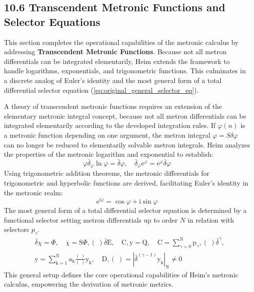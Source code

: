 \documentclass[12pt]{article}
\begin{document}
\subsection{10.6 Transcendent Metronic Functions and Selector Equations}
\label{sec:transcendent_functions}

This section completes the operational capabilities of the metronic calculus by addressing \textbf{Transcendent Metronic Functions}. Because not all metron differentials can be integrated elementarily, Heim extends the framework to handle logarithms, exponentials, and trigonometric functions. This culminates in a discrete analog of Euler's identity and the most general form of a total differential selector equation (\eqref{eq:original_general_selector_eq}).

A theory of transcendent metronic functions requires an extension of the elementary metronic integral concept, because not all metron differentials can be integrated elementarily according to the developed integration rules. If \( \varphi(n) \) is a metronic function depending on one argument, the metron integral \( \varphi = S \delta \varphi \) can no longer be reduced to elementarily solvable metron integrals. Heim analyzes the properties of the metronic logarithm and exponential to establish:
\begin{equation}
\varphi \bar{\delta}_\varphi \ln \varphi = \bar{\delta}\varphi, \quad \bar{\delta}_\varphi \mathrm{e}^\varphi = \mathrm{e}^\varphi \bar{\delta}\varphi \tag{81}
\end{equation}
Using trigonometric addition theorems, the metronic differentials for trigonometric and hyperbolic functions are derived, facilitating Euler's identity in the metronic realm:
\begin{equation}
\mathrm{e}^{\mathrm{i}\varphi} = \cos \varphi + \mathrm{i} \sin \varphi \tag{81a}
\end{equation}
The most general form of a total differential selector equation is determined by a functional selector setting metron differentials up to order \( N \) in relation with selectors \( p_\gamma \).
\begin{equation}
\begin{aligned}
& \bar{\delta}\chi = \Phi, \quad \chi = \mathrm{S}\Phi, (\ ) \bar{\delta}\mathrm{E}, \quad \mathrm{C}, \mathrm{y} = \mathrm{Q}, \quad \mathrm{C} = \sum_{\gamma=0}^\mathrm{N} \mathrm{p}_\gamma, (\ ) \bar{\delta}^\gamma, \\
& \mathrm{y} = \sum_{\mathrm{k}=1}^\mathrm{N} \mathrm{a_k} \frac{(\ )}{(\ )} \mathrm{y_k}, \quad \mathrm{D}, (\ ) = \left| \bar{\delta}^{(\gamma-1)} \mathrm{y_k} \right|_\mathrm{N} \neq 0
\end{aligned} \tag{82}
\label{eq:original_general_selector_eq}
\end{equation}
This general setup defines the core operational capabilities of Heim's metronic calculus, empowering the derivation of metronic metrics.
\end{document}
